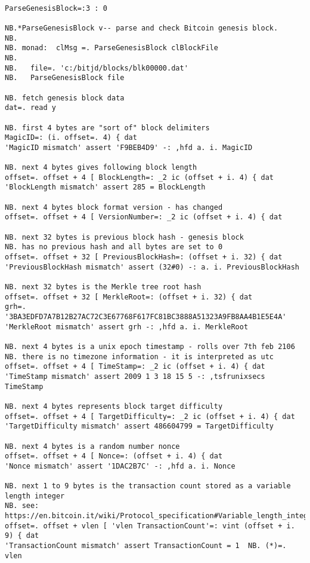 \newpage
\begin{lstlisting}[language=jdoc, frame=single,framerule=0pt,label=lst:scr4754X0]

ParseGenesisBlock=:3 : 0

NB.*ParseGenesisBlock v-- parse and check Bitcoin genesis block.
NB.
NB. monad:  clMsg =. ParseGenesisBlock clBlockFile
NB.
NB.   file=. 'c:/bitjd/blocks/blk00000.dat'
NB.   ParseGenesisBlock file

NB. fetch genesis block data
dat=. read y

NB. first 4 bytes are "sort of" block delimiters
MagicID=: (i. offset=. 4) { dat
'MagicID mismatch' assert 'F9BEB4D9' -: ,hfd a. i. MagicID

NB. next 4 bytes gives following block length
offset=. offset + 4 [ BlockLength=: _2 ic (offset + i. 4) { dat
'BlockLength mismatch' assert 285 = BlockLength

NB. next 4 bytes block format version - has changed
offset=. offset + 4 [ VersionNumber=: _2 ic (offset + i. 4) { dat

NB. next 32 bytes is previous block hash - genesis block
NB. has no previous hash and all bytes are set to 0
offset=. offset + 32 [ PreviousBlockHash=: (offset + i. 32) { dat
'PreviousBlockHash mismatch' assert (32#0) -: a. i. PreviousBlockHash

NB. next 32 bytes is the Merkle tree root hash
offset=. offset + 32 [ MerkleRoot=: (offset + i. 32) { dat
grh=. '3BA3EDFD7A7B12B27AC72C3E67768F617FC81BC3888A51323A9FB8AA4B1E5E4A'
'MerkleRoot mismatch' assert grh -: ,hfd a. i. MerkleRoot

NB. next 4 bytes is a unix epoch timestamp - rolls over 7th feb 2106
NB. there is no timezone information - it is interpreted as utc
offset=. offset + 4 [ TimeStamp=: _2 ic (offset + i. 4) { dat
'TimeStamp mismatch' assert 2009 1 3 18 15 5 -: ,tsfrunixsecs TimeStamp

NB. next 4 bytes represents block target difficulty
offset=. offset + 4 [ TargetDifficulty=: _2 ic (offset + i. 4) { dat
'TargetDifficulty mismatch' assert 486604799 = TargetDifficulty

NB. next 4 bytes is a random number nonce
offset=. offset + 4 [ Nonce=: (offset + i. 4) { dat
'Nonce mismatch' assert '1DAC2B7C' -: ,hfd a. i. Nonce

NB. next 1 to 9 bytes is the transaction count stored as a variable length integer
NB. see:  https://en.bitcoin.it/wiki/Protocol_specification#Variable_length_integer
offset=. offset + vlen [ 'vlen TransactionCount'=: vint (offset + i. 9) { dat
'TransactionCount mismatch' assert TransactionCount = 1  NB. (*)=. vlen


\end{lstlisting}

